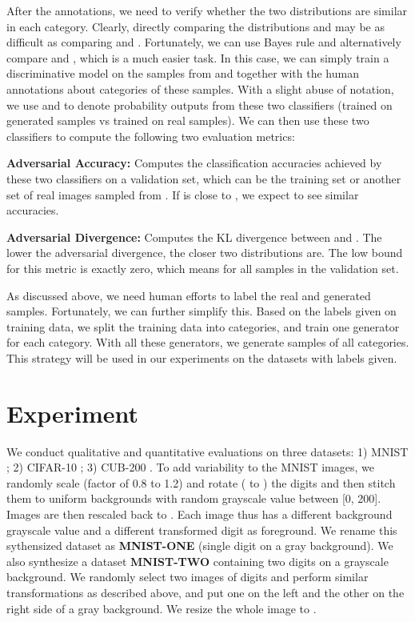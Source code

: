 \documentclass{article} \usepackage{iclr2017_conference,times}
\begin{document}
After the annotations, we need to verify whether the two distributions are similar in each category. Clearly, directly comparing the distributions  and  may be as difficult as comparing  and . Fortunately, we can use Bayes rule and alternatively compare  and , which is a much easier task. In this case, we can simply train a discriminative model on the samples from  and  together with the human annotations about categories of these samples. With a slight abuse of notation, we use  and  to denote probability outputs from these two classifiers (trained on generated samples vs trained on real samples). We can then use these two classifiers to compute the following two evaluation metrics: 

\textbf{Adversarial Accuracy:} Computes the classification accuracies achieved by these two classifiers on a validation set, which can be the training set or another set of real images sampled from . If  is close to , we expect to see similar accuracies.

\textbf{Adversarial Divergence:} Computes the KL divergence between  and . The lower the adversarial divergence, the closer two distributions are. The low bound for this metric is exactly zero, which means  for all samples in the validation set. 

As discussed above, we need human efforts to label the real and generated samples. Fortunately, we can further simplify this. Based on the labels given on training data, we split the training data into categories, and train one generator for each category. With all these generators, we generate samples of all categories. This strategy will be used in our experiments on the datasets with labels given.




 
%
 

\section{Experiment}
\vspace{-5pt}
We conduct qualitative and quantitative evaluations on three datasets: 1) MNIST \citep{MNIST}; 2) CIFAR-10 \citep{CIFAR10}; 3) CUB-200 \citep{CUB200}. To add variability to the MNIST images, we randomly scale (factor of 0.8 to 1.2) and rotate ( to ) the digits and then stitch them to  uniform backgrounds with random grayscale value between [0, 200]. Images are then rescaled back to . Each image thus has a different background grayscale value and a different transformed digit as foreground. We rename this sythensized dataset as \textbf{MNIST-ONE} (single digit on a gray background). We also synthesize a dataset \textbf{MNIST-TWO} containing two digits on a grayscale background. We randomly select two images of digits and perform similar transformations as described above, and put one on the left and the other on the right side of a  gray background. We resize the whole image to .
\end{document}
